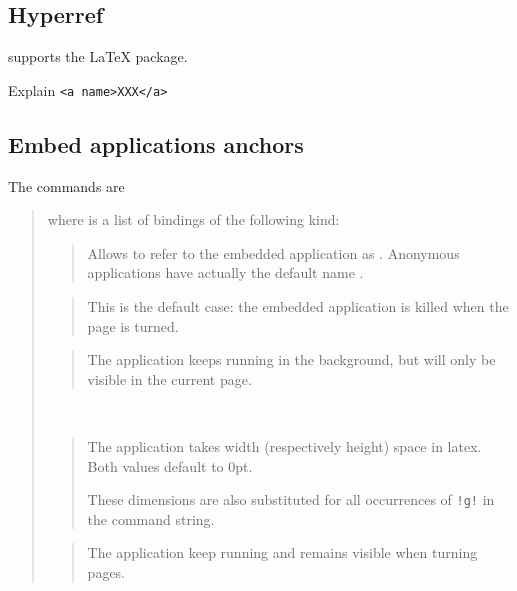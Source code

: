 \documentclass[12pt]{article}
\begin{document}
\subsection {Hyperref}

{\ActiveDVI} supports the  {\LaTeX} package. 

Explain \verb"<a name>XXX</a>"

\subsection {Embed applications anchors}

The commands are 

\medskip\noindent
\docdef \adviembed{} 

\begin{quote}
where  is a list of bindings of the following kind:

\begin{quote}
Allows to refer to the embedded application as . 
Anonymous applications have actually the default name .
\end{quote}


\begin{quote}
This is the default case: the embedded application is killed when the page
is turned.
\end{quote}


\begin{quote}
The application keeps running in the background, but will only be visible in
the current page.
\end{quote}

\\
\begin{quote}
The application takes  width (respectively height) space in 
latex. Both values default to 0pt.

These dimensions are also substituted for all occurrences of \verb"!g!" in
the command string. 
\end{quote}

\begin{quote}
The application keep running and remains visible when turning pages.
\end{quote}

\end{quote}
\end{document}
